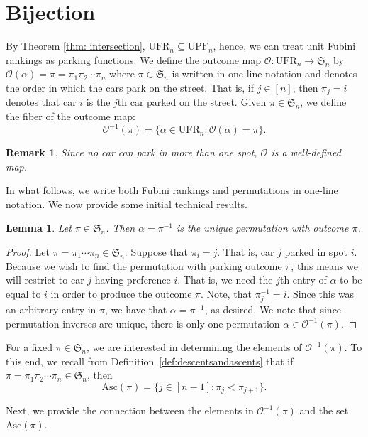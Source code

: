 \documentclass[11pt,reqno]{amsart}
\newcommand*{\Out}{\mathcal{O}}
\newcommand{\Asc}{\mathrm{Asc}}
\newtheorem{lemma}{Lemma}[section]
\newtheorem{remark}{Remark}[section]
\theoremstyle{definition}
\theoremstyle{notation}
\theoremstyle{openproblem}
\newcommand{\Sym}{\mathfrak{S}}
\newcommand{\upf}[1]{\text{UPF}_{#1}}
\newcommand{\UFR}[1]{\text{UFR}_{#1}}
\begin{document}
\section{Bijection}
\label{sec: bijection}

By Theorem \ref{thm: intersection}, $\UFR{n}\subseteq \upf{n}$, hence, we can treat unit Fubini rankings as parking functions.
We define the outcome map $\Out: \UFR{n} \rightarrow \Sym_n$ by $\Out(\alpha)=\pi=\pi_1\pi_2\cdots\pi_n$
where $\pi\in\Sym_n$ is written in one-line notation and denotes the order in which the cars park on the street. 
That is, if $j\in[n]$, then $\pi_j=i$ denotes that car $i$ is the $j$th car parked on the street.  
Given $\pi\in \Sym_n$, we define the fiber of the outcome map:
\[\Out^{-1}(\pi)=
\{\alpha\in\UFR{n}: \Out(\alpha)=\pi\}.
\]

\begin{remark}\label{rem:OutWellDef}
    Since no car can park in more than one spot, $\Out$ is a well-defined map.
\end{remark}

In what follows, we write both Fubini rankings and permutations in one-line notation.
We now provide some initial technical results.
\begin{lemma}
    Let $\pi\in \Sym_n$.
    Then $\alpha = \pi^{-1}$ is the unique permutation with outcome $\pi$.
\end{lemma}


\begin{proof}
    Let $\pi = \pi_1 \cdots \pi_n \in \Sym_n$. Suppose that $\pi_i = j$. 
    That is, car $j$ parked in spot $i$. 
    Because we wish to find the permutation with parking outcome $\pi$, this means we will restrict to car $j$ having preference $i$. 
    That is, we need the $j$th entry of $\alpha$ to be equal to $i$ in order to produce the outcome $\pi$. 
    Note, that $\pi^{-1}_j = i$. Since this was an arbitrary entry in $\pi$, we have that $\alpha = \pi^{-1}$, as desired.
    We note that since permutation inverses are unique, there is only one permutation $\alpha \in \Out^{-1} (\pi)$.
\end{proof}

For a fixed $\pi\in\Sym_n$, we are interested in determining the elements of $\Out^{-1}(\pi)$. To this end, we recall from Definition~\ref{def:descentsandascents} that if $\pi=\pi_1\pi_2\cdots\pi_n\in\Sym_n$, then 
\[\Asc(\pi)=\{j \in [n-1]: \pi_j<\pi_{j+1}\}.\]


Next, we provide the connection between the elements in $\Out^{-1}(\pi)$ and the set $\Asc(\pi)$.
\end{document}
